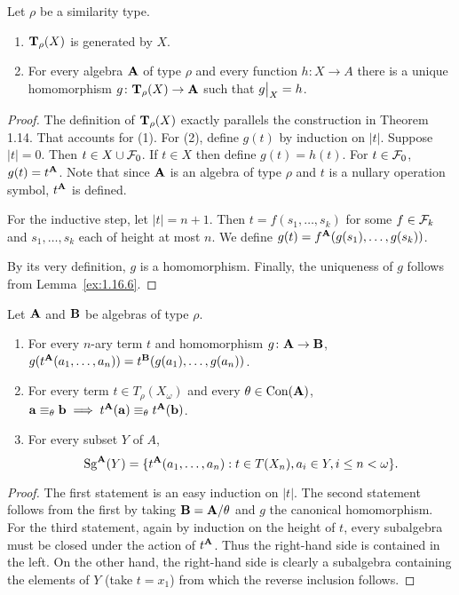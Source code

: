 \begin{theorem} 
  \label{thm:4.21}
  Let $\rho$ be a similarity type.
  \begin{enumerate}
    \item $\mathbf{T}_\rho(X)$ is generated by $X$.
    \item For every algebra $\mathbf{A}$ of type $\rho$ and every function 
    $h\colon X \to A$ there is a unique homomorphism $g\colon \mathbf{T}_\rho(X) \to \mathbf{A}$ 
    such that $\restr{g}{X} = h$.
  \end{enumerate}
\end{theorem}
\begin{proof} The definition of $\mathbf{T}_\rho(X)$ exactly parallels the construction in 
Theorem 1.14. That accounts for (1). For (2), define $g(t)$ by induction on $|t|$. 
Suppose $|t| = 0$. Then $t \in X \cup \mathcal{F}_0$. If $t \in X$ then define 
$g(t) = h(t)$. For $t \in \mathcal{F}_0$, $g(t) = t^{\mathbf{A}}$. 
Note that since $\mathbf{A}$ is an algebra of type $\rho$ and $t$ is a nullary 
operation symbol, $t^{\mathbf{A}}$ is defined.

For the inductive step, let $|t| = n + 1$. Then $t = f(s_1, \dots, s_k)$ for some 
$f \in \mathcal{F}_k$ and $s_1, \dots, s_k$ each of height at most $n$. We define
$g(t) = f^{\mathbf{A}}(g(s_1), \dots, g(s_k))$.

By its very definition, $g$ is a homomorphism.
Finally, the uniqueness of $g$ follows from Lemma~\ref{ex:1.16.6}.
\end{proof}


\begin{theorem} 
  \label{thm:4.32} 
Let $\mathbf{A}$ and $\mathbf{B}$ be algebras of type $\rho$.
\begin{enumerate}
  \item
    For every $n$-ary term $t$ and homomorphism $g\colon \mathbf{A} \to \mathbf{B}$, 
    $g(t^{\mathbf{A}}(a_1,\dots, a_n)) = t^{\mathbf{B}}(g(a_1),\dots, g(a_n))$.
  \item
    For every term $t \in T_\rho(X_\omega)$ and every $\theta \in \operatorname{Con}(\mathbf{A})$, 
    $\mathbf{a} \equiv_\theta \mathbf{b} \implies t^{\mathbf{A}}(\mathbf{a}) \equiv_\theta t^{\mathbf{A}}(\mathbf{b})$.
  \item
    For every subset $Y$ of $A$,
    \[\operatorname{Sg}^{\mathbf{A}}(Y) = 
    \{ t^{\mathbf{A}}(a_1,\dots, a_n) : t \in T(X_n), a_i \in Y, i \leq n < \omega\}.\]
\end{enumerate}
\end{theorem}
\begin{proof} 
  The first statement is an easy induction on $|t|$. 
  The second statement follows from the first by taking $\mathbf{B} = \mathbf{A}/\theta$ 
  and $g$ the canonical homomorphism. For the third statement, again by induction on the 
  height of $t$, every subalgebra must be closed under the action of $t^{\mathbf{A}}$. 
  Thus the right-hand side is contained in the left. On the other hand, the right-hand 
  side is clearly a subalgebra containing the elements of $Y$ (take $t = x_1$) from 
  which the reverse inclusion follows.
\end{proof}

